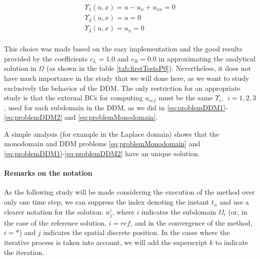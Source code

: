 \begin{equation*}
	\begin{gathered}
	\Upsilon_1(u,x) = u - u_x + u_{xx} = 0\\
	\Upsilon_2(u,x) = u = 0\\
	\Upsilon_3(u,x) = u_x = 0\\
	\end{gathered}
\end{equation*}

\indent This choice was made based on the easy implementation and the good results provided by the coefficients $c_L = 1.0$ and $c_R = 0.0$ in approximating the analytical solution in $\Omega$ (as shown in the table \ref{tab:firstTestsP0}). Nevertheless, it does not have much importance in the study that we will done here, as we want to study exclusively the behavior of the DDM. The only restriction for an appropriate study is that the external BCs for computing $u_{ref}$ must be the same $\Upsilon_i, \ \ i=1,2,3$, used for each subdomain in the DDM, as we did in \eqref{eq:problemDDM1}-\eqref{eq:problemDDM2} and \eqref{eq:problemMonodomain}.

\indent A simple analysis (for example in the Laplace domain) shows that the monodomain and DDM problems \eqref{eq:problemMonodomain} and \eqref{eq:problemDDM1}-\eqref{eq:problemDDM2} have an unique solution.

\paragraph{Remarks on the notation}


\indent As the following study will be made considering the execution of the method over only one time step, we can suppress the index denoting the instant $t_n$ and use a clearer notation for the solution: $u_j^i$, where $i$ indicates the subdomain $\Omega_i$ (or, in the case of the reference solution, $i = ref$, and in the convergence of the method, $i = *$) and $j$ indicates the spatial discrete position. In the cases where the iterative process is taken into account, we will add the superscript $k$ to indicate the iteration.

